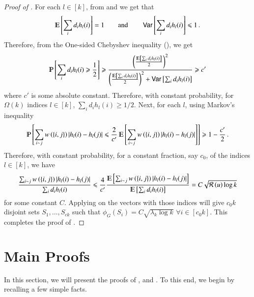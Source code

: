 \documentclass[11pt]{article}
\newcommand{\ralsymb}{\cR}
\newcommand{\ral}[1]{\ralsymb\left(#1\right)} %
\begin{document}
\begin{proof}[Proof of  ]
For each $l \in [k]$, from  and  we get that 
\[ \Ex{\sum_i d_i h_l(i) } = 1 \qquad \textrm{and} \qquad  \var{ \sum_i d_i h_l(i)} \leq 1 \mper \] %
Therefore, from the One-sided Chebyshev inequality (), we get
\begin{equation}
\label{eq:manysparse-helper1}
 \Pr{ \sum_i d_i h_l(i) \geq  \frac{1 }{2}  } \geq
\frac{ \left( \frac{\Ex{\sum_i d_i h_l(i) }}{2}  \right)^2 }{  \left( \frac{\Ex{\sum_i d_i h_l(i) }}{2}  \right)^2
+  \var{ \sum_i d_i h_l(i)}  } \geq  c' 
\end{equation}
where $c'$ is some absolute constant.
Therefore, with constant probability, for $\Omega(k)$ indices $l \in [k]$,
$\sum_i d_i h_l(i) \geq  1/2 $.
Next, for each $l$, using Markov's inequality
\begin{equation}
\label{eq:manysparse-helper2}
\Pr{  \sum_{i \sim j} w \paren{ \set{i,j} } \Abs{h_l(i) - h_l(j)} 
\leq \frac{2}{c'} \Ex{\sum_{i \sim j} w \paren{ \set{i,j} }
\Abs{h_l(i) - h_l(j)}} } \geq 1 - \frac{c'}{2} \mper 
\end{equation}
Therefore, with constant probability, for a constant fraction, say
$c_0$, of the indices $l \in [k]$,
we have
\[  \frac{\sum_{i \sim j} w \paren{ \set{i,j} } \Abs{h_l(i) - h_l(j)}}{ \sum_i d_i h_l(i) } \leq
\frac{4}{c'} \frac{\Ex{\sum_{i \sim j} w \paren{ \set{i,j} } \Abs{h_l(i) - h_l(j)}}}{ \Ex{ \sum_i d_i h_l(i) }} 
 =  C \sqrt{\ral{u} \log k} \]
for some constant $C$.
Applying  on the vectors with those indices will
give $c_0 k$ disjoint
sets $S_1, \ldots, S_{ck}$ such that $\phi_G(S_i) = C\sqrt{\lambda_k \log k}$
$\forall i \in [c_0 k]$.  This completes the proof of .
\end{proof}




\section{Main Proofs}

In this section, we will present the proofs of ,
 and .  To this end, we begin by
recalling a few simple facts.
\end{document}
